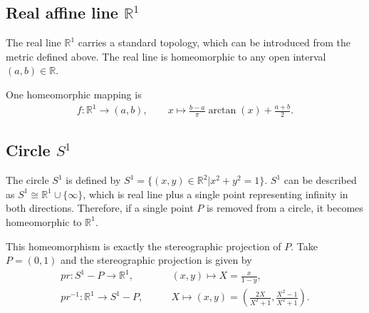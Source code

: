 \documentclass{report}
\begin{document}
\subsection{Real affine line $\mathbb{R}^1$}
The real line $\mathbb{R}^1$ carries a standard topology, which can be introduced from the metric defined above. The real line is homeomorphic to any open interval $(a, b)\in\mathbb{R}$.
\begin{center}
\end{center}
One homeomorphic mapping is
\begin{align*}
	f:\mathbb{R}^1\longrightarrow(a, b),\qquad
	x\longmapsto \frac{b-a}{\pi}\arctan\left(x\right)+\frac{a+b}{2}.
\end{align*}

\subsection{Circle $S^1$}
The circle $S^1$ is defined by $S^1=\{(x,y)\in\mathbb{R}^2|x^2+y^2=1\}$. $S^1$ can be described as $S^1\cong \mathbb{R}^1\cup\{\infty\}$, which is real line plus a single point representing infinity in both directions. Therefore, if a single point $P$ is removed from a circle, it becomes homeomorphic to $\mathbb{R}^1$.
\begin{center}
\end{center}
This homeomorphism is exactly the stereographic projection of $P$. Take $P=(0,1)$ and the stereographic projection is given by
\begin{align*}
	pr:S^1-P\longrightarrow \mathbb{R}^1,\qquad      & (x, y) \longmapsto X=\frac{x}{1-y},                                           \\
	pr^{-1}:\mathbb{R}^1\longrightarrow S^1-P,\qquad & X \longmapsto(x, y)=\left(\frac{2X}{X^{2}+1}, \frac{X^{2}-1}{X^{2}+1}\right).
\end{align*}
\end{document}
